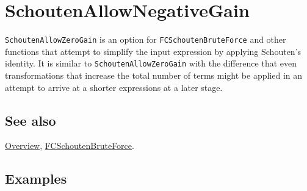 \documentclass[../FeynCalcManual.tex]{subfiles}
\begin{document}
\hypertarget{schoutenallownegativegain}{
\section{SchoutenAllowNegativeGain}\label{schoutenallownegativegain}}

\texttt{SchoutenAllowZeroGain} is an option for
\texttt{FCSchoutenBruteForce} and other functions that attempt to
simplify the input expression by applying Schouten's identity. It is
similar to \texttt{SchoutenAllowZeroGain} with the difference that even
transformations that increase the total number of terms might be applied
in an attempt to arrive at a shorter expressions at a later stage.

\subsection{See also}

\hyperlink{toc}{Overview},
\hyperlink{fcschoutenbruteforce}{FCSchoutenBruteForce}.

\subsection{Examples}
\end{document}
